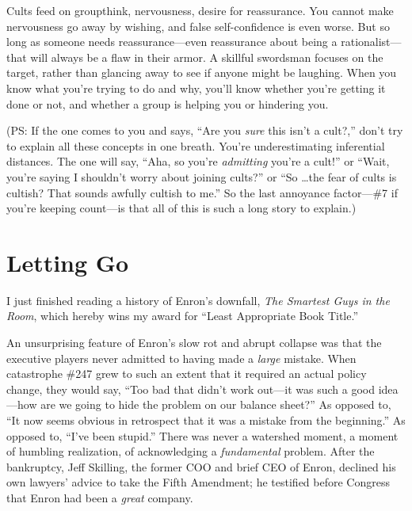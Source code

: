 {
 Cults feed on groupthink, nervousness, desire for reassurance. You
cannot make nervousness go away by wishing, and false self-confidence
is even worse. But so long as someone needs reassurance---even
reassurance about being a rationalist---that will always be a flaw in
their armor. A skillful swordsman focuses on the target, rather than
glancing away to see if anyone might be laughing. When you know what
you're trying to do and why, you'll
know whether you're getting it done or not, and whether
a group is helping you or hindering you.}

{
 (PS: If the one comes to you and says, ``Are you
\textit{sure} this isn't a cult?,''
don't try to explain all these concepts in one breath.
You're underestimating inferential distances. The one
will say, ``Aha, so you're
\textit{admitting} you're a cult!''
or ``Wait, you're saying I
shouldn't worry about joining
cults?'' or ``So \ldots the fear of
cults is cultish? That sounds awfully cultish to
me.'' So the last annoyance factor---\#7 if
you're keeping count---is that all of this is such a
long story to explain.)}

\myendsectiontext


\chapter{Letting Go}


{
 I just finished reading a history of Enron's
downfall, \textit{The Smartest Guys in the Room}, which hereby wins my
award for ``Least Appropriate Book
Title.'' }

{
 An unsurprising feature of Enron's slow rot and
abrupt collapse was that the executive players never admitted to having
made a \textit{large} mistake. When catastrophe \#247 grew to such an
extent that it required an actual policy change, they would say,
``Too bad that didn't work out---it
was such a good idea---how are we going to hide the problem on our
balance sheet?'' As opposed to, ``It
now seems obvious in retrospect that it was a mistake from the
beginning.'' As opposed to,
``I've been
stupid.'' There was never a watershed moment, a
moment of humbling realization, of acknowledging a \textit{fundamental}
problem. After the bankruptcy, Jeff Skilling, the former COO and brief
CEO of Enron, declined his own lawyers' advice to take
the Fifth Amendment; he testified before Congress that Enron had been a
\textit{great} company.}

